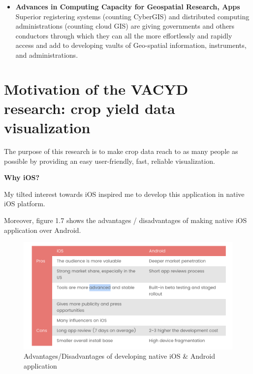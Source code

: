 \begin{itemize}
  \item  \textbf{Advances in Computing Capacity for Geospatial Research, Apps} \\
 Superior registering systems (counting CyberGIS) and distributed computing administrations (counting cloud GIS) are giving governments and others conductors through which they can all the more effortlessly and rapidly access and add to developing vaults of Geo-spatial information, instruments, and administrations.
  
\end{itemize}

\section{Motivation of the VACYD research: crop yield data visualization}

The purpose of this research is to make crop data reach to as many people as possible by providing an easy user-friendly, fast, reliable visualization.


\textbf{Why \gls{iOS}?}



My tilted interest towards \gls{iOS} inspired me to develop this application in native \gls{iOS} platform.

Moreover, figure 1.7 shows the advantages / disadvantages of making native \gls{iOS} application over Android.


  \begin{figure}[H]
            \centering
            \includegraphics[width=0.8\linewidth]{figures/ch1/iosVSandroid.png}
            \caption{\label{fig:future_work_distribution} Advantages/Disadvantages of developing native iOS \& Android application}
    \end{figure}


